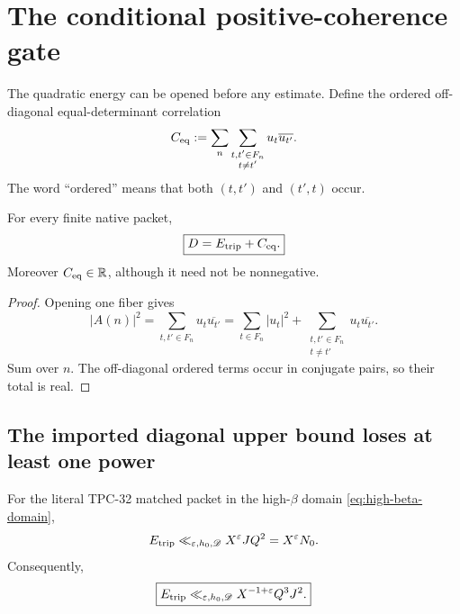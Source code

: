 \section{The conditional positive-coherence gate}
\label{sec:correlation-decomposition}

The quadratic energy can be opened before any estimate.  Define the
ordered off-diagonal equal-determinant correlation
\begin{equation}
 C_{\mathrm{eq}}
 :=
 \sum_n
 \sum_{\substack{t,t'\in F_n\\t\ne t'}}
 u_t\overline{u_{t'}}.
\label{eq:Ceq-definition}
\end{equation}
The word ``ordered'' means that both \((t,t')\) and \((t',t)\) occur.

\begin{proposition}
\label{prop:D-decomposition}
For every finite native packet,
\begin{equation}
 \boxed{D=E_{\mathrm{trip}}+C_{\mathrm{eq}}.}
\label{eq:D-decomposition}
\end{equation}
Moreover \(C_{\mathrm{eq}}\in\mathbb R\), although it need not be nonnegative.
\end{proposition}

\begin{proof}
Opening one fiber gives
\[
 |A(n)|^2
 =\sum_{t,t'\in F_n}u_t\overline{u_{t'}}
 =\sum_{t\in F_n}|u_t|^2
 +\sum_{\substack{t,t'\in F_n\\t\ne t'}}
 u_t\overline{u_{t'}}.
\]
Sum over \(n\).  The off-diagonal ordered terms occur in conjugate
pairs, so their total is real.
\end{proof}

\subsection{The imported diagonal upper bound loses at least one power}

\begin{proposition}
\label{prop:triplet-diagonal-upper}
For the literal TPC-32 matched packet in the high-\(\beta\) domain
\eqref{eq:high-beta-domain},
\begin{equation}
 E_{\mathrm{trip}}
 \ll_{\varepsilon,h_0,\mathscr D}
 X^\varepsilon JQ^2
 =X^\varepsilon N_0.
\label{eq:Etrip-upper}
\end{equation}
Consequently,
\begin{equation}
 \boxed{
 E_{\mathrm{trip}}
 \ll_{\varepsilon,h_0,\mathscr D}
 X^{-1+\varepsilon}Q^3J^2.}
\label{eq:Etrip-natural-comparison}
\end{equation}
\end{proposition}

